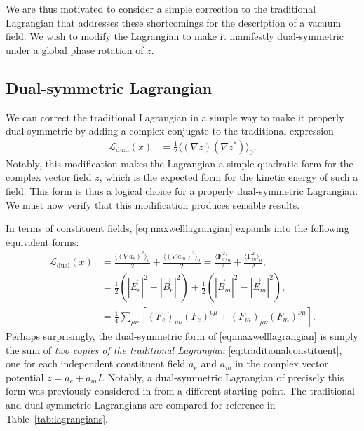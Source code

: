 \documentclass[1p,sort&compress]{elsarticle}
\numberwithin{equation}{section}
\newcommand{\rv}[1]{\vec{#1}}
\newcommand{\bv}[1]{\mathbf{#1}}
\newcommand{\mean}[1]{\langle #1 \rangle}
\begin{document}
We are thus motivated to consider a simple correction to the traditional Lagrangian that addresses these shortcomings for the description of a vacuum field.  We wish to modify the Lagrangian to make it manifestly dual-symmetric under a global phase rotation of $z$.


\subsection{Dual-symmetric Lagrangian}


We can correct the traditional Lagrangian in a simple way to make it properly dual-symmetric by adding a complex conjugate to the traditional expression
\begin{align}\label{eq:maxwelllagrangian}
  \mathcal{L}_{\text{dual}}(x) &= \frac{1}{2}\mean{(\nabla z)(\nabla z^*)}_0.
\end{align}
Notably, this modification makes the Lagrangian a simple quadratic form for the complex vector field $z$, which is the expected form for the kinetic energy of such a field.  This form is thus a logical choice for a properly dual-symmetric Lagrangian.  We must now verify that this modification produces sensible results.

In terms of constituent fields, \eqref{eq:maxwelllagrangian} expands into the following equivalent forms:
\begin{align}\label{eq:maxwelllagrangianpotentials}
  \mathcal{L}_{\text{dual}}(x) &= \frac{\mean{(\nabla a_e)^2}_0}{2} + \frac{\mean{(\nabla a_m)^2}_0}{2} = \frac{\mean{\bv{F}_e^2}_0}{2} + \frac{\mean{\bv{F}_m^2}_0}{2}, \\
  &= \frac{1}{2}(|\rv{E}_e|^2 - |\rv{B}_e|^2) + \frac{1}{2}(|\rv{B}_m|^2 - |\rv{E}_m|^2), \nonumber \\
  &= \frac{1}{4}\sum_{\mu\nu}[ (F_e)_{\mu\nu}(F_e)^{\nu\mu} + (F_m)_{\mu\nu}(F_m)^{\nu\mu}]. \nonumber
\end{align}
Perhaps surprisingly, the dual-symmetric form of \eqref{eq:maxwelllagrangian} is simply the sum of \emph{two copies of the traditional Lagrangian} \eqref{eq:traditionalconstituent}, one for each independent constituent field $a_e$ and $a_m$ in the complex vector potential $z = a_e + a_m I$.  Notably, a dual-symmetric Lagrangian of precisely this form was previously considered in \cite{Singleton1995,Singleton1996,Kato2002,Vasconcellos2014} from a different starting point.  The traditional and dual-symmetric Lagrangians are compared for reference in Table~\ref{tab:lagrangians}.
\end{document}
